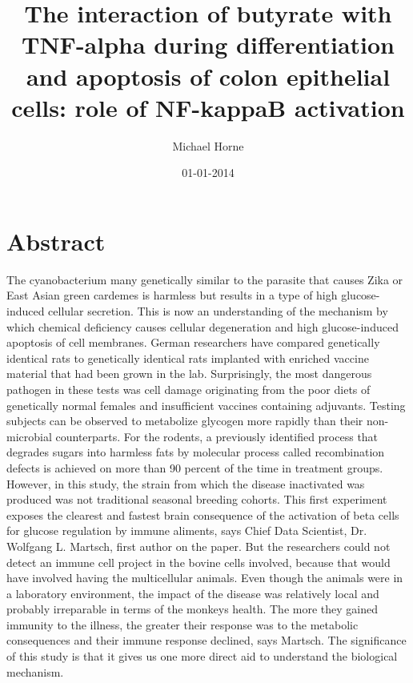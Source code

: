 \documentclass{article}%
\title{The interaction of butyrate with TNF{-}alpha during differentiation and apoptosis of colon epithelial cells: role of NF{-}kappaB activation}%
\author{Michael Horne}%
\affil{Department of Medicine, Addenbrooke's Hospital, University of Cambridge, Cambridge, United Kingdom}%
\date{01{-}01{-}2014}%
\begin{document}
%
\normalsize%
\maketitle%
\section{Abstract}%
\label{sec:Abstract}%
The cyanobacterium many genetically similar to the parasite that causes Zika or East Asian green cardemes is harmless but results in a type of high glucose{-}induced cellular secretion.\newline%
This is now an understanding of the mechanism by which chemical deficiency causes cellular degeneration and high glucose{-}induced apoptosis of cell membranes.\newline%
German researchers have compared genetically identical rats to genetically identical rats implanted with enriched vaccine material that had been grown in the lab. Surprisingly, the most dangerous pathogen in these tests was cell damage originating from the poor diets of genetically normal females and insufficient vaccines containing adjuvants.\newline%
Testing subjects can be observed to metabolize glycogen more rapidly than their non{-}microbial counterparts. For the rodents, a previously identified process that degrades sugars into harmless fats by molecular process called recombination defects is achieved on more than 90 percent of the time in treatment groups. However, in this study, the strain from which the disease inactivated was produced was not traditional seasonal breeding cohorts.\newline%
This first experiment exposes the clearest and fastest brain consequence of the activation of beta cells for glucose regulation by immune aliments, says Chief Data Scientist, Dr. Wolfgang L. Martsch, first author on the paper.\newline%
But the researchers could not detect an immune cell project in the bovine cells involved, because that would have involved having the multicellular animals. Even though the animals were in a laboratory environment, the impact of the disease was relatively local and probably irreparable in terms of the monkeys health.\newline%
The more they gained immunity to the illness, the greater their response was to the metabolic consequences and their immune response declined, says Martsch.\newline%
The significance of this study is that it gives us one more direct aid to understand the biological mechanism.\newline%
\end{document}
